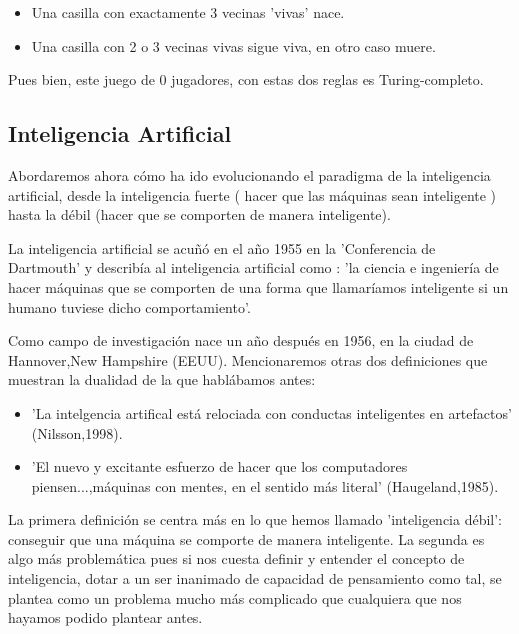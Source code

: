 \begin{multicols}{2}
	\begin{itemize}
		\item Una casilla con exactamente 3 vecinas 'vivas' nace.
		\item Una casilla con 2 o 3 vecinas vivas sigue viva, en otro caso muere.
	\end{itemize}
\end{multicols}


Pues bien, este juego de 0 jugadores, con estas dos reglas es Turing-completo.

\subsection{Inteligencia Artificial}

Abordaremos ahora cómo ha ido evolucionando el paradigma de la inteligencia artificial, desde la inteligencia fuerte ( hacer que las máquinas sean inteligente ) hasta la débil (hacer que se comporten de manera inteligente).


La inteligencia artificial se acuñó en el año 1955 en la 'Conferencia de Dartmouth' y describía al inteligencia artificial como : 'la ciencia e ingeniería de hacer máquinas que se comporten de una forma que llamaríamos inteligente si un humano tuviese dicho comportamiento'. 

Como campo de investigación nace un año después en 1956, en la ciudad de Hannover,New Hampshire (EEUU). Mencionaremos otras dos definiciones que muestran la dualidad de la que hablábamos antes:

\begin{itemize}
	\item 'La intelgencia artifical está relociada con conductas inteligentes en artefactos' (Nilsson,1998).
	\item 'El nuevo y excitante esfuerzo de hacer que los computadores piensen...,máquinas con mentes, en el sentido más literal' (Haugeland,1985).
\end{itemize}

La primera definición se centra más en lo que hemos llamado 'inteligencia débil': conseguir que una máquina se comporte de manera inteligente. La segunda es algo más problemática pues si nos cuesta definir y entender el concepto de inteligencia, dotar a un ser inanimado de capacidad de pensamiento como tal, se plantea como un problema mucho más complicado que cualquiera que nos hayamos podido plantear antes.

